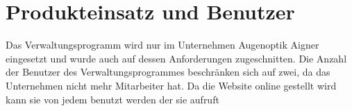 \section{Produkteinsatz und Benutzer}
Das Verwaltungsprogramm wird nur im Unternehmen Augenoptik Aigner eingesetzt und wurde auch auf dessen Anforderungen zugeschnitten. Die Anzahl der Benutzer des Verwaltungsprogrammes beschränken sich auf zwei, da das Unternehmen nicht mehr Mitarbeiter hat. \newline
Da die Website online gestellt wird kann sie von jedem benutzt werden der sie aufruft



